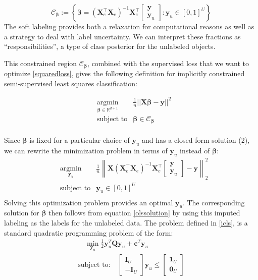 \documentclass{llncs}
\newcommand{\featdim}{d}
\newcommand{\Nunl}{U}
\newcommand{\X}{\mathbf{X}  }
\newcommand{\Xe}{\mathbf{X}_e  }
\newcommand{\XeT}{\mathbf{X}_e^{\top}}
\newcommand{\ye}{\begin{bmatrix} \mathbf{y}  \\ \mathbf{y}_u \end{bmatrix}}
\begin{document}
\begin{equation} \label{constrainedregion}
\mathcal{C}_{\boldsymbol{\beta}} := \left\{   \boldsymbol{\beta} = \left( {\XeT} {\Xe} \right)^{-1} {\XeT} \ye: \mathbf{y}_u \in [0,1]^{\Nunl} \right\}
\end{equation}
The soft labeling provides both a relaxation for computational reasons as well as a strategy to deal with label uncertainty. We can interpret these fractions as ``responsibilities'', a type of class posterior for the unlabeled objects. 

This constrained region $\mathcal{C}_{\boldsymbol{\beta}}$, combined with the supervised loss that we want to optimize \eqref{squaredloss}, gives the following definition for implicitly constrained semi-supervised least squares classification:

\begin{center}
\begin{equation}
\begin{aligned}
&\operatorname*{argmin}_{\boldsymbol{\beta} \in \mathbb{R}^{\featdim+1}} & \frac{1}{n}  ||\mathbf{X} \boldsymbol{\beta}-\mathbf{y}||^2  \\
& \text{subject to} & \boldsymbol{\beta} \in \mathcal{C}_{\boldsymbol{\beta}}  \\
\end{aligned}
\end{equation}
\end{center}
Since $\boldsymbol{\beta}$ is fixed for a particular choice of $\textbf{y}_u$ and has a closed form solution (2), we can rewrite the minimization problem in terms of $\textbf{y}_u$ instead of $\boldsymbol{\beta}$:
\begin{equation} \label{icls}
\begin{aligned}
& \operatorname*{argmin}_{\mathbf{y}_u} & \frac{1}{n}  \left\|  \X \left(\XeT \Xe \right)^{-1} \XeT \ye - \mathbf{y} \right\|_2^2 \\ 
& \text{subject to} & \mathbf{y}_u \in [0,1]^{\Nunl} \\
\end{aligned}
\end{equation}
Solving this optimization problem provides an optimal $\mathbf{y}_u$. The corresponding solution for $\boldsymbol{\beta}$ then follows from equation \eqref{olssolution} by using this imputed labeling as the labels for the unlabeled data. The problem defined in \eqref{icls}, is a standard quadratic programming problem of the form:
\begin{equation}
\begin{aligned}
& \quad \min_{\mathbf{y}_u} \frac{1}{2} \textbf{y}_u^T  \textbf{Q}  \textbf{y}_u + \textbf{c}^T \textbf{y}_u   & \\
& \text{subject to:}  \quad \begin{bmatrix} \textbf{I}_{\Nunl}  \\ -\textbf{I}_{\Nunl} \end{bmatrix}  \textbf{y}_u \leq \begin{bmatrix} \textbf{1}_{\Nunl}  \\ \textbf{0}_{\Nunl} \end{bmatrix} & \\
\end{aligned}
\end{equation}
\end{document}
